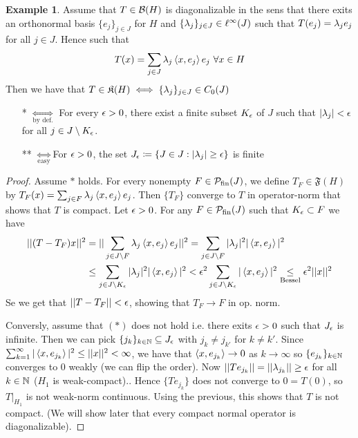 \documentclass[10pt,english,a4paper]{article}
\theoremstyle{definition}
\newtheorem*{example}{Example}
\def\Psfin{\mathcal{P}_{\textnormal{fin}}}
\def\Ff{\mathfrak{F}}
\def\Kf{\mathfrak{K}}
\begin{document}
\begin{example}
    Assume that $T \in \mathcal{B}(H)$ is diagonalizable in the sens that there exits 
an orthonormal basis $\{e_j\}_{j \in J}$ for $H$ and $\{\lambda_j\}_{j\in J} \in
\ell^{\infty}(J)$ such that $T(e_j) = \lambda_je_j$ for all $j\in J$. Hence such that 
\[ T(x) = \sum_{j \in J} \lambda_{j}\left\langle x, e_j \right\rangle e_j ~\forall x \in H \]
Then we have that $T \in \Kf(H)\iff \{\la_j\}_{j\in J} \in C_{0}(J)$ 
\begin{itemize}
    \item[*] $\underset{\text{by def.}}{\iff}$ For every $\epsilon >0$, there exist
    a finite subset $K_{\epsilon}$ of $J$ such that $|\lambda_j|<\epsilon$ for all $j\in
    J\setminus K_{\epsilon}$.

    \item[**] $\underset{\text{easy}}{\iff}$For $\epsilon >0$, the set $J_{\epsilon}\coloneqq \{ J \in J : |\lambda_j| \geq \epsilon\}$
    is finite
\end{itemize}
\begin{proof}
   Assume $*$ holds. For every nonempty $F \in \Psfin(J)$, we define $T_F \in \Ff(H)$
by $T_{F}(x) = \sum_{j \in F}\lambda_j\left\langle x,e_j \right\rangle e_j$. Then $\{T_F\}$ converge to 
$T$ in operator-norm that shows that $T$ is compact. Let $\epsilon>0$. For any $F \in \Psfin(J)$
such that $K_{\epsilon} \subset F$ we have 
\begin{align*}
||(T-T_F)x||^2 &= ||\sum_{j\in J\setminus F}\lambda_j\left\langle x,e_j \right\rangle e_j||^2 
= \sum_{j\in J\setminus F} |\lambda_j|^2 |\left\langle x,e_j \right\rangle|^2 \\
&\leq \sum_{j\in J\setminus K_{\epsilon}} |\lambda_j|^2 |\left\langle x,e_j \right\rangle|^2 
< \epsilon^2 \sum_{j \in J\setminus K_{\epsilon}}|\left\langle x,e_j \right\rangle|^2 \underset{\text{Bessel}}{\leq}\epsilon^2 ||x||^2
\end{align*}
Se we get that $||T-T_F|| < \epsilon$, showing that $T_F \to F$ in op. norm. 

Conversly, assume that $(*)$ does not hold i.e. there exits $\epsilon>0$ such that 
$J_{\epsilon}$ is infinite. Then we can pick $\{j_k\}_{k\in \mathbb{N}} \subseteq J_{\epsilon}$
with $j_k \neq j_{k'}$ for $k\neq k'$. Since $\sum_{k=1}^{\infty}
|\left\langle x,e_{j_k} \right\rangle|^2 \leq ||x||^2 <\infty$, we have that $\left\langle x,e_{j_k} \right\rangle \to 0$
as $k\to \infty$ so $\{e_{j_k}\}_{k\in \mathbb{N}}$ converges to 0 weakly (we can flip the order). 
Now $||Te_{j_k}|| = ||\lambda_{j_k}|| \geq \epsilon$ for all $k \in \mathbb{N}$ ($H_1$ is weak-compact).. Hence $\{Te_{j_k}\}$
does not converge to $0 = T(0)$, so $T\lvert_{H_1}$ is not weak-norm continuous. 
Using the previous, this shows that $T$ is not compact. (We will show later that 
every compact normal operator is diagonalizable).
\end{proof}
\end{example}
\end{document}
